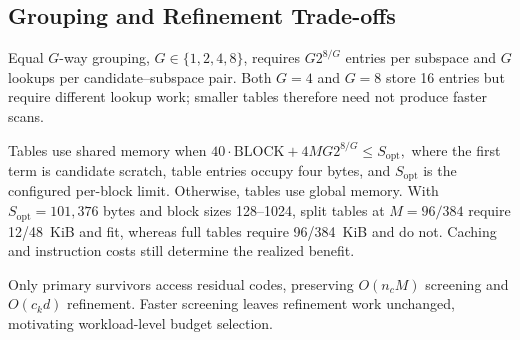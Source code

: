 \subsection{Grouping and Refinement Trade-offs}
\label{sec:grouping_tradeoff}
Equal $G$-way grouping, $G\in\{1,2,4,8\}$, requires $G2^{8/G}$ entries per subspace and $G$ lookups per candidate--subspace pair. Both $G=4$ and $G=8$ store 16 entries but require different lookup work; smaller tables therefore need not produce faster scans.

Tables use shared memory when
$
40\cdot\mathrm{BLOCK}+4MG2^{8/G}\leq S_{\mathrm{opt}},
\label{eq:shared_memory_budget}
$
where the first term is candidate scratch, table entries occupy four bytes, and $S_{\mathrm{opt}}$ is the configured per-block limit. Otherwise, tables use global memory. With $S_{\mathrm{opt}}=101{,}376$ bytes and block sizes 128--1024, split tables at $M=96/384$ require 12/48~KiB and fit, whereas full tables require 96/384~KiB and do not. Caching and instruction costs still determine the realized benefit.

Only primary survivors access residual codes, preserving $O(n_cM)$ screening and $O(c_kd)$ refinement. Faster screening leaves refinement work unchanged, motivating workload-level budget selection.
